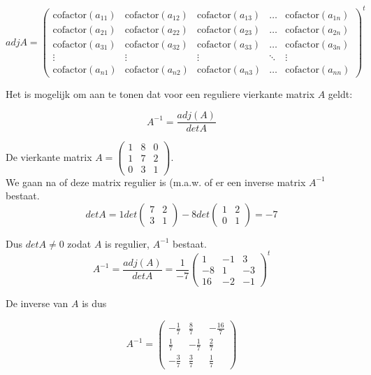 \[ adj{A}=\left( \begin{matrix}
\text{cofactor}(a_{11}) & \text{cofactor}(a_{12}) & \text{cofactor}(a_{13}) & \ldots & \text{cofactor}(a_{1n}) \\
\text{cofactor}(a_{21}) & \text{cofactor}(a_{22}) & \text{cofactor}(a_{23}) & \ldots & \text{cofactor}(a_{2n}) \\ 
\text{cofactor}(a_{31}) & \text{cofactor}(a_{32}) & \text{cofactor}(a_{33}) & \ldots & \text{cofactor}(a_{3n}) \\
\vdots & \vdots &  \vdots & \ddots & \vdots \\
\text{cofactor}(a_{n1}) & \text{cofactor}(a_{n2}) & \text{cofactor}(a_{n3}) & \ldots & \text{cofactor}(a_{nn})
\end{matrix} \right)^{t}           \]


Het is mogelijk om aan te tonen dat voor een reguliere vierkante matrix $A$ geldt:


	\[  A^{-1}=\frac{adj(A)}{det A}    \]


\begin{voorbeeld}
	

De vierkante matrix $A= \left( \begin{matrix} 1 & 8 & 0 \\ 1 & 7 & 2 \\ 0 & 3 & 1 \end{matrix} \right)$.\\

We gaan na of deze matrix regulier is (m.a.w. of er een inverse matrix $A^{-1}$ bestaat.\\
  
\[ det A= 1 det \left( \begin{matrix} 7 & 2 \\ 3 & 1 \end{matrix} \right) -8 det \left( \begin{matrix} 1 & 2 \\ 0 & 1 \end{matrix} \right) = -7   \]

Dus $det A \neq 0$ zodat $A$ is regulier, $A^{-1}$ bestaat.\\

\[  A^{-1}= \frac{adj(A)}{det A} = \frac{1}{-7} \left( \begin{matrix}
1 & -1 & 3 \\
-8 & 1 & -3 \\
16 & -2 & -1 
\end{matrix} \right)^{t}                   \]

De inverse van $A$ is dus

\[ A^{-1}= \left( \begin{matrix}
-\frac{1}{7} & \frac{8}{7} & -\frac{16}{7} \\
\frac{1}{7} & -\frac{1}{7} & \frac{2}{7} \\
-\frac{3}{7} & \frac{3}{7} & \frac{1}{7}
\end{matrix}   \right)
\]

\end{voorbeeld}

